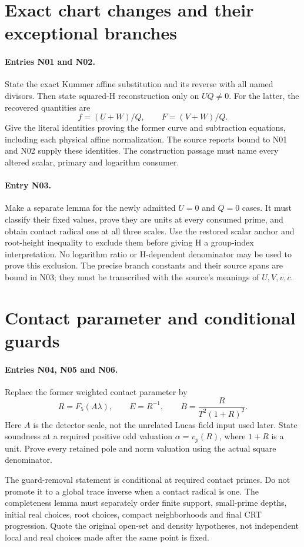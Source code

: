 \documentclass{article}
\begin{document}
\section{Exact chart changes and their exceptional branches}
\label{outline:charts}
\paragraph{Entries N01 and N02.}
State the exact Kummer affine substitution and its reverse with all named
divisors. Then state squared-H reconstruction only on $UQ\ne0$.
For the latter, the recovered quantities are
\[
 f=(U+W)/Q,\qquad F=(V+W)/Q.
\]
Give the literal identities proving the former curve and subtraction
equations, including each physical affine normalization. The source
reports bound to N01 and N02 supply these identities. The construction
passage must name every altered scalar, primary and logarithm consumer.

\paragraph{Entry N03.}
Make a separate lemma for the newly admitted $U=0$ and $Q=0$ cases.
It must classify their fixed values, prove they are units at every
consumed prime, and obtain contact radical one at all three scales.
Use the restored scalar anchor and root-height inequality to exclude
them before giving H a group-index interpretation. No logarithm ratio
or H-dependent denominator may be used to prove this exclusion.
The precise branch constants and their source spans are bound in N03;
they must be transcribed with the source's meanings of $U,V,v,c$.

\section{Contact parameter and conditional guards}
\label{outline:contact}
\paragraph{Entries N04, N05 and N06.}
Replace the former weighted contact parameter by
\[
 R=F_5(A\lambda),\qquad E=R^{-1},\qquad
 B=\frac{R}{T^2(1+R)^2}.
\]
Here $A$ is the detector scale, not the unrelated Lucas field input
used later. State soundness at a required positive odd valuation
$\alpha=v_p(R)$, where $1+R$ is a unit. Prove every retained pole and
norm valuation using the actual square denominator.

The guard-removal statement is conditional at required contact primes.
Do not promote it to a global trace inverse when a contact radical is one.
The completeness lemma must separately order finite support, small-prime
depths, initial real choices, root choices, compact neighborhoods and final
CRT progression. Quote the original open-set and density hypotheses,
not independent local and real choices made after the same point is fixed.
\end{document}
